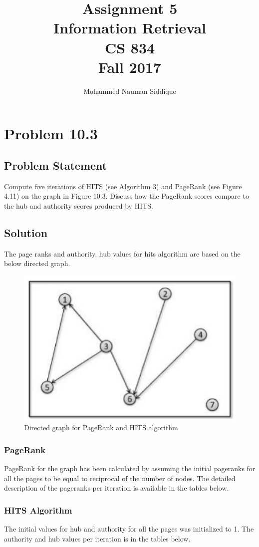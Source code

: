 \documentclass[12pt]{report}
\author{Mohammed Nauman Siddique}
\title{Assignment 5 \\Information Retrieval \\ CS 834 \\ Fall 2017 }
\begin{document}
\maketitle
\tableofcontents
\chapter{Problem 10.3}
\section{Problem Statement}
Compute five iterations of HITS (see Algorithm 3) and PageRank (see Figure 4.11) on the graph in Figure 10.3. Discuss how the PageRank scores compare to the hub and authority scores produced by HITS.
\section{Solution}
The page ranks and authority, hub values for hits algorithm are based on the below directed graph. 
\begin{figure}[ht]
  \centering
  \includegraphics[width=1\textwidth]{Problem10_3/Graph.png}
  \caption{Directed graph for PageRank and HITS algorithm}
  \label{fig:1}
\end{figure} 
\subsection{PageRank}
PageRank for the graph has been calculated by assuming the initial pageranks for all the pages to be equal to reciprocal of the number of nodes. The detailed description of the pageranks per iteration is available in the tables below.
\subsection{HITS Algorithm}
The initial values for hub and authority for all the pages was initialized to 1. The authority and hub values per iteration is in the tables below.
\end{document}

